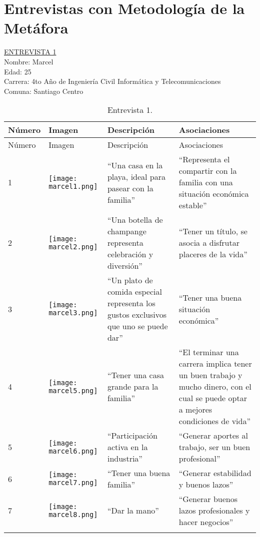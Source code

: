 \chapter{Entrevistas con Metodología de la Metáfora}
\label{ch:anexo-a}
\newpage
\underline {ENTREVISTA 1} \\
Nombre: Marcel\\
Edad: 25\\
Carrera: 4to Año de Ingeniería Civil Informática y Telecomunicaciones\\
Comuna: Santiago Centro \\

\begin{longtable}{>{\centering\arraybackslash}m{1cm} >{\centering\arraybackslash}m{2cm} >{\arraybackslash}m{5cm}>{\arraybackslash}m{5cm}}
	
\hline
Número & Imagen & Descripción & Asociaciones \\
\hline \hline
\endfirsthead

\hline
Número & Imagen & Descripción & Asociaciones \\
\hline \hline
\endhead

1 & \texttt{[image: marcel1.png]} & ``Una casa en la playa, ideal para pasear con la familia'' & ``Representa el compartir con la familia con una situación económica estable'' \\
\hline

2 & \texttt{[image: marcel2.png]} & ``Una botella de champange representa celebración y diversión'' & ``Tener un título, se asocia a disfrutar placeres de la vida'' \\
\hline

3 & \texttt{[image: marcel3.png]} & ``Un plato de comida especial representa los gustos exclusivos que uno se puede dar'' & ``Tener una buena situación económica'' \\
\hline

4 & \texttt{[image: marcel5.png]} & ``Tener una casa grande para la familia''  & ``El terminar una carrera implica tener un buen trabajo y mucho dinero, con el cual se puede optar a mejores condiciones de vida'' \\
\hline

5 & \texttt{[image: marcel6.png]} & ``Participación activa en la industria'' & ``Generar aportes al trabajo, ser un buen profesional'' \\
\hline

6 & \texttt{[image: marcel7.png]} & ``Tener una buena familia'' & ``Generar estabilidad y buenos lazos'' \\
\hline

7 & \texttt{[image: marcel8.png]} & ``Dar la mano'' &  ``Generar buenos lazos profesionales y hacer negocios'' \\
\hline


\caption{Entrevista 1.}
\label{tabla:marcel}
\end{longtable}

